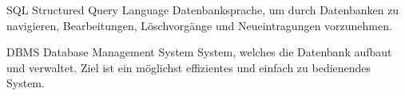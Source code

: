   {SQL}            %
  { Structured Query Language}  %
  {Datenbanksprache, um durch Datenbanken zu navigieren, Bearbeitungen, Löschvorgänge und Neueintragungen vorzunehmen.} %
  
  {DBMS}            %
  { Database Management System}  %
  {System, welches die Datenbank aufbaut und verwaltet. Ziel ist ein möglichst effizientes und einfach zu bedienendes System.} %



